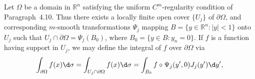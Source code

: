 \begin{para}
  Let $\Omega$ be a domain in $\mathbb{R}^n$ satisfying the uniform $C^m$-regularity
  condition of Paragraph~4.10. Thus there exists a locally finite open cover
  $\{U_j\}$ of $\partial\Omega$, and corresponding $m$-smooth transformations
  $\Psi_j$ mapping $B = \{y\in \mathbb{R}^n : |y|<1\}$ onto $U_j$ such that
  $U_j\cap \partial\Omega = \Psi_j(B_0)$, where $B_0 = \{y\in B : y_n = 0\}$.
  If $f$ is a function having support in $U_j$, we may define the integral
  of $f$ over $\partial\Omega$ via
  \[ \int_{\partial\Omega} f(x) \d\sigma
      = \int_{U_j\cap\partial\Omega} f(x) \d\sigma
      = \int_{B_0} f\circ \Psi_j(y',0) J_j(y') \d y', \]
\end{para}
